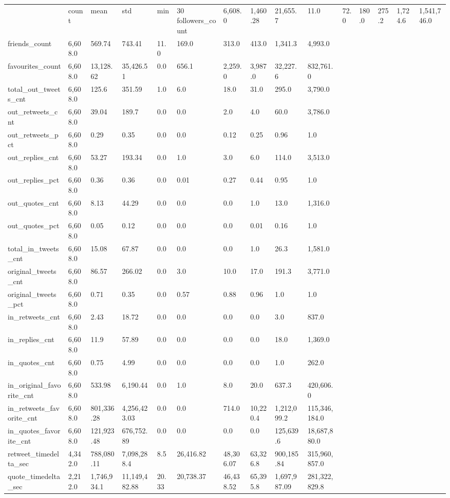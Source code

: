 \begin{tabular}{llllllllll}
 & count & mean & std & min & 30%
followers_count & 6,608.0 & 1,460.28 & 21,655.7 & 11.0 & 72.0 & 180.0 & 275.2 & 1,724.6 & 1,541,746.0 \\
friends_count & 6,608.0 & 569.74 & 743.41 & 11.0 & 169.0 & 313.0 & 413.0 & 1,341.3 & 4,993.0 \\
favourites_count & 6,608.0 & 13,128.62 & 35,426.51 & 0.0 & 656.1 & 2,259.0 & 3,987.0 & 32,227.6 & 832,761.0 \\
total_out_tweets_cnt & 6,608.0 & 125.6 & 351.59 & 1.0 & 6.0 & 18.0 & 31.0 & 295.0 & 3,790.0 \\
out_retweets_cnt & 6,608.0 & 39.04 & 189.7 & 0.0 & 0.0 & 2.0 & 4.0 & 60.0 & 3,786.0 \\
out_retweets_pct & 6,608.0 & 0.29 & 0.35 & 0.0 & 0.0 & 0.12 & 0.25 & 0.96 & 1.0 \\
out_replies_cnt & 6,608.0 & 53.27 & 193.34 & 0.0 & 1.0 & 3.0 & 6.0 & 114.0 & 3,513.0 \\
out_replies_pct & 6,608.0 & 0.36 & 0.36 & 0.0 & 0.01 & 0.27 & 0.44 & 0.95 & 1.0 \\
out_quotes_cnt & 6,608.0 & 8.13 & 44.29 & 0.0 & 0.0 & 0.0 & 1.0 & 13.0 & 1,316.0 \\
out_quotes_pct & 6,608.0 & 0.05 & 0.12 & 0.0 & 0.0 & 0.0 & 0.01 & 0.16 & 1.0 \\
total_in_tweets_cnt & 6,608.0 & 15.08 & 67.87 & 0.0 & 0.0 & 0.0 & 1.0 & 26.3 & 1,581.0 \\
original_tweets_cnt & 6,608.0 & 86.57 & 266.02 & 0.0 & 3.0 & 10.0 & 17.0 & 191.3 & 3,771.0 \\
original_tweets_pct & 6,608.0 & 0.71 & 0.35 & 0.0 & 0.57 & 0.88 & 0.96 & 1.0 & 1.0 \\
in_retweets_cnt & 6,608.0 & 2.43 & 18.72 & 0.0 & 0.0 & 0.0 & 0.0 & 3.0 & 837.0 \\
in_replies_cnt & 6,608.0 & 11.9 & 57.89 & 0.0 & 0.0 & 0.0 & 0.0 & 18.0 & 1,369.0 \\
in_quotes_cnt & 6,608.0 & 0.75 & 4.99 & 0.0 & 0.0 & 0.0 & 0.0 & 1.0 & 262.0 \\
in_original_favorite_cnt & 6,608.0 & 533.98 & 6,190.44 & 0.0 & 1.0 & 8.0 & 20.0 & 637.3 & 420,606.0 \\
in_retweets_favorite_cnt & 6,608.0 & 801,336.28 & 4,256,423.03 & 0.0 & 0.0 & 714.0 & 10,220.4 & 1,212,099.2 & 115,346,184.0 \\
in_quotes_favorite_cnt & 6,608.0 & 121,923.48 & 676,752.89 & 0.0 & 0.0 & 0.0 & 0.0 & 125,639.6 & 18,687,880.0 \\
retweet_timedelta_sec & 4,342.0 & 788,080.11 & 7,098,288.4 & 8.5 & 26,416.82 & 48,306.07 & 63,326.8 & 900,185.84 & 315,960,857.0 \\
quote_timedelta_sec & 2,212.0 & 1,746,934.1 & 11,149,482.88 & 20.33 & 20,738.37 & 46,438.52 & 65,395.8 & 1,697,987.09 & 281,322,829.8 \\
\end{tabular}
